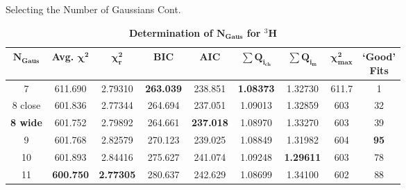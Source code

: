 \documentclass[10pt]{beamer}
\begin{document}
\begin{frame}[fragile]{Selecting the Number of Gaussians Cont.}
	\pause
	\vspace{-5mm}
	{\scriptsize{
	\begin{table}[!h]
	\centering
	\begin{tabular}{|c c c c c c c c c|}
	\hline
	$\boldsymbol{N_{Gaus}}$ & \textbf{Avg.} $\boldsymbol{\chi^2}$ & $\boldsymbol{\chi^2_r}$ & \textbf{BIC} & \textbf{AIC} & $\boldsymbol{\sum Q_{i_{ch}}}$ & $\boldsymbol{\sum Q_{i_{m}}}$ & $\boldsymbol{\chi^2_{max}}$ & 		\makecell{\textbf{`Good'}\\ 	\textbf{Fits}} \\
	\hline
	7 & 611.690 & 2.79310 & \alert{\textbf{263.039}} & 238.851 & \alert{\textbf{1.08373}} & 1.32730 & 611.7 & 1\\
	8 close & 601.836 & 2.77344 & 264.694 & 237.051 & 1.09013 & 1.32859 & 603 & 32\\
	\alert{\textbf{8 wide}} & 601.752 & 2.79892 & 264.661 & \alert{\textbf{237.018}} & 1.08970 & 1.33270 & 603 & 39\\
	9 & 601.768 & 2.82579 & 270.123 & 239.025 & 1.08849 & 1.31982 & 604 & \alert{\textbf{95}}\\
	10 & 601.893 & 2.84416 & 275.627 & 241.074 & 1.09248 & \alert{\textbf{1.29611}} & 603 & 78\\
	11 & \alert{\textbf{600.750}} & \alert{\textbf{2.77305}} & 280.637 & 242.629 & 1.08699 & 1.34100 & 602 & 88\\
	\hline
	\end{tabular}
	\caption{\bf{Determination of $\boldsymbol{N_{Gaus}}$ for $^3$H}}
	\label{tab:3h_ngaus}
	\end{table}
	}}

\end{frame}
\end{document}
